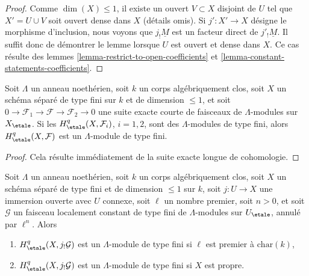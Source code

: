 \begin{proof}
Comme $\dim(X) \leq 1$, il existe un ouvert $V \subset X$ disjoint de
$U$ tel que $X' = U \cup V$ soit ouvert dense dans $X$ (détails omis).
Si $j' : X' \to X$ désigne le morphisme d'inclusion, nous voyons que
$j_!\underline{M}$ est un facteur direct de $j'_!\underline{M}$.
Il suffit donc de démontrer le lemme lorsque $U$ est ouvert et dense dans $X$.
Ce cas résulte des lemmes \ref{lemma-restrict-to-open-coefficients}
et \ref{lemma-constant-statements-coefficients}.
\end{proof}

\begin{lemma}
\label{lemma-ses-statements-coefficients}
Soit $\Lambda$ un anneau noethérien, soit $k$ un corps algébriquement clos,
soit $X$ un schéma séparé de type fini sur $k$ et de dimension $\leq 1$, et soit
$0 \to \mathcal{F}_1 \to \mathcal{F} \to \mathcal{F}_2 \to 0$
une suite exacte courte de faisceaux de $\Lambda$-modules sur $X_\etale$. Si
les $H^q_\etale(X, \mathcal{F}_i)$, $i = 1, 2$, sont des $\Lambda$-modules de type fini,
alors $H^q_\etale(X, \mathcal{F})$ est un $\Lambda$-module de type fini.
\end{lemma}

\begin{proof}
Cela résulte immédiatement de la suite exacte longue de cohomologie.
\end{proof}

\begin{lemma}
\label{lemma-vanishing-easier-coefficients}
Soit $\Lambda$ un anneau noethérien, soit $k$ un corps algébriquement clos,
soit $X$ un schéma séparé de type fini et de dimension $\leq 1$ sur $k$,
soit $j : U \to X$ une immersion ouverte avec $U$ connexe, soit
$\ell$ un nombre premier, soit $n > 0$, et soit $\mathcal{G}$ un faisceau
localement constant de type fini de $\Lambda$-modules sur $U_\etale$, annulé par
$\ell^n$. Alors
\begin{enumerate}
\item $H^q_\etale(X, j_!\mathcal{G})$ est un $\Lambda$-module de type fini
si $\ell$ est premier à $\text{char}(k)$,
\item $H^q_\etale(X, j_!\mathcal{G})$ est un $\Lambda$-module de type fini
si $X$ est propre.
\end{enumerate}
\end{lemma}

